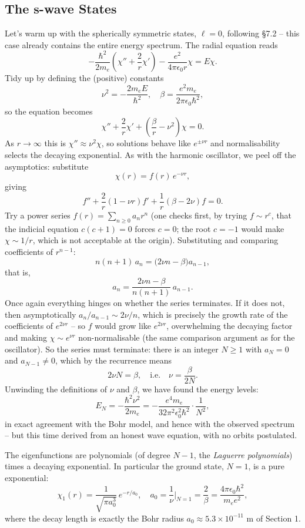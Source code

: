 \subsection{The s-wave States}

Let's warm up with the spherically symmetric states, $\ell = 0$, following \S 7.2 -- this case already contains the entire energy spectrum. The radial equation reads
$$
-\frac{\hbar^2}{2 m_e}\left( \chi'' + \frac{2}{r} \chi' \right) - \frac{e^2}{4 \pi \epsilon_0 r} \chi = E \chi.
$$
Tidy up by defining the (positive) constants
$$
\nu^2 = -\frac{2 m_e E}{\hbar^2}, \quad \beta = \frac{e^2 m_e}{2 \pi \epsilon_0 \hbar^2},
$$
so the equation becomes
$$
\chi'' + \frac{2}{r} \chi' + \left( \frac{\beta}{r} - \nu^2 \right) \chi = 0.
$$
As $r \rightarrow \infty$ this is $\chi'' \approx \nu^2 \chi$, so solutions behave like $e^{\pm \nu r}$ and normalisability selects the decaying exponential. As with the harmonic oscillator, we peel off the asymptotics: substitute
$$
\chi(r) = f(r) \, e^{-\nu r},
$$
giving
$$
f'' + \frac{2}{r}(1 - \nu r) f' + \frac{1}{r}(\beta - 2 \nu) f = 0.
$$
Try a power series $f(r) = \sum_{n \geq 0} a_n r^n$ (one checks first, by trying $f \sim r^c$, that the indicial equation $c(c+1) = 0$ forces $c = 0$; the root $c = -1$ would make $\chi \sim 1/r$, which is not acceptable at the origin). Substituting and comparing coefficients of $r^{n-1}$:
$$
n(n+1) \, a_n = \big( 2 \nu n - \beta \big) a_{n - 1},
$$
that is,
$$
a_n = \frac{2 \nu n - \beta}{n(n+1)} \, a_{n-1}.
$$
Once again everything hinges on whether the series terminates. If it does not, then asymptotically $a_n / a_{n-1} \sim 2\nu/n$, which is precisely the growth rate of the coefficients of $e^{2 \nu r}$ -- so $f$ would grow like $e^{2\nu r}$, overwhelming the decaying factor and making $\chi \sim e^{\nu r}$ non-normalisable (the same comparison argument as for the oscillator). So the series must terminate: there is an integer $N \geq 1$ with $a_{N} = 0$ and $a_{N - 1} \neq 0$, which by the recurrence means
$$
2 \nu N = \beta, \quad \text{i.e.} \quad \nu = \frac{\beta}{2N}.
$$
Unwinding the definitions of $\nu$ and $\beta$, we have found the energy levels:
$$
E_N = -\frac{\hbar^2 \nu^2}{2 m_e} = -\frac{e^4 m_e}{32 \pi^2 \epsilon_0^2 \hbar^2} \cdot \frac{1}{N^2},
$$
in exact agreement with the Bohr model, and hence with the observed spectrum -- but this time derived from an honest wave equation, with no orbits postulated.

The eigenfunctions are polynomials (of degree $N - 1$, the \emph{Laguerre polynomials}) times a decaying exponential. In particular the ground state, $N = 1$, is a pure exponential:
$$
\chi_1(r) = \frac{1}{\sqrt{\pi a_0^3}} \, e^{-r/a_0}, \quad a_0 = \frac{1}{\nu}\bigg|_{N=1} = \frac{2}{\beta} = \frac{4 \pi \epsilon_0 \hbar^2}{m_e e^2},
$$
where the decay length is exactly the Bohr radius $a_0 \approx 5.3 \times 10^{-11}$ m of Section 1.

